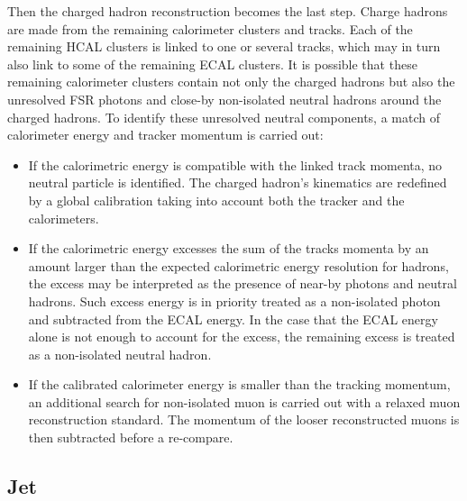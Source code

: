 Then the charged hadron reconstruction becomes the last step. Charge hadrons are made from the remaining calorimeter clusters and tracks. Each of the remaining HCAL clusters is linked to one or several tracks, which may in turn also link to some of the remaining ECAL clusters. It is possible that these remaining calorimeter clusters contain not only the charged hadrons but also the unresolved FSR photons and close-by non-isolated neutral hadrons around the charged hadrons. To identify these unresolved neutral components, a match of calorimeter energy and tracker momentum is carried out:

\begin{itemize}
    \item If the calorimetric energy is compatible with the linked track momenta, no neutral particle is identified. The charged hadron's kinematics are redefined by a global calibration taking into account both the tracker and the calorimeters. 
    \item If the calorimetric energy excesses the sum of the tracks momenta by an amount larger than the expected calorimetric energy resolution for hadrons, the excess may be interpreted as the presence of near-by photons and neutral hadrons. Such excess energy is in priority treated as a non-isolated photon and subtracted from the ECAL energy. In the case that the ECAL energy alone is not enough to account for the excess, the remaining excess is treated as a non-isolated neutral hadron. 
    \item If the calibrated calorimeter energy is smaller than the tracking momentum, an additional search for non-isolated muon is carried out with a relaxed muon reconstruction standard. The momentum of the looser reconstructed muons is then subtracted before a re-compare.
\end{itemize}







\subsection{Jet}


